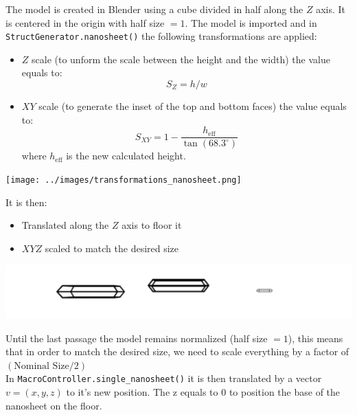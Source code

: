 \documentclass{article}
\begin{document}
The model is created in Blender using a cube divided in half along the $Z$ axis. It is centered in the origin with half size $=1$.
The model is imported and in \texttt{StructGenerator.nanosheet()} the following transformations are applied:
\begin{itemize}
    \item $Z$ scale (to unform the scale between the height and the width) the value equals to: $$S_Z = h / w$$
    \item $XY$ scale (to generate the inset of the top and bottom faces) the value equals to: $$S_{XY} = 1 - \frac{h_\text{eff}}{\tan(68.3^{\circ})}$$ where $h_\text{eff}$ is the new calculated height.
\end{itemize}
\begin{center}
    \texttt{[image: ../images/transformations\_nanosheet.png]}
\end{center}
It is then:
\begin{itemize}
    \item Translated along the $Z$ axis to floor it 
    \item $XYZ$ scaled to match the desired size 
\end{itemize}
\begin{center}
    \includegraphics[width=1\textwidth]{../images/transformations2_nanosheet.png}
\end{center}
Until the last passage the model remains normalized (half size $=1$), this means that in order to match the desired size, we need to scale everything by a factor of $(\text{Nominal Size} / 2)$
\\[.5cm]
In \texttt{MacroController.single\_nanosheet()} it is then translated by a vector $v = (x, y, z)$ to it's new position. The z equals to $0$ to position the base of the nanosheet on the floor.
\end{document}
